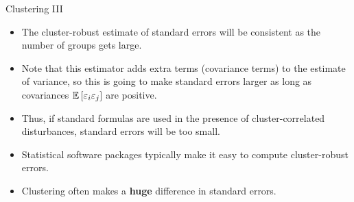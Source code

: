 \begin{frame}{Clustering III}
\begin{itemize}
	\item The cluster-robust estimate of standard errors will be consistent as the number of groups 
	gets large.

	\item Note that this estimator adds extra terms (covariance terms) to the estimate of variance,
	so this is going to make standard errors larger as long as covariances $\mathbb{E}\left[\varepsilon_i \varepsilon_j\right]$ are positive. 

	\item Thus, if standard formulas are used in the presence of cluster-correlated disturbances, 
	standard errors will be too small.

	\item Statistical software packages typically make it easy to compute cluster-robust errors.
	
	\item Clustering often makes a {\bf huge} difference in standard errors.

\end{itemize}
\end{frame}








